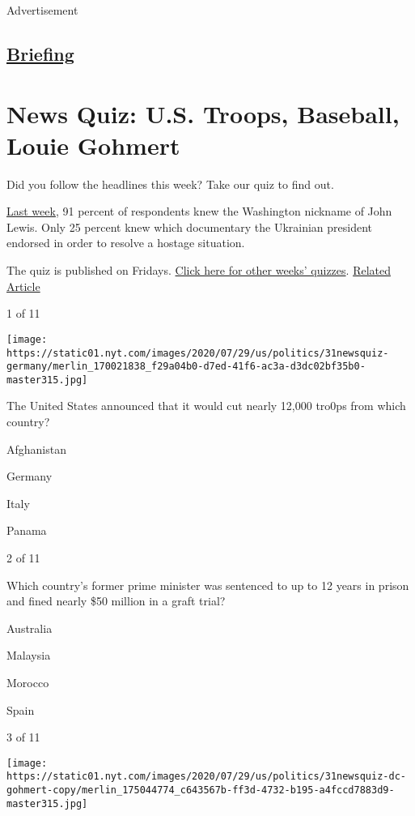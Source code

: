 Advertisement

\hypertarget{-briefing-}{%
\subsection{\texorpdfstring{
\href{/interactive/2018/briefing/global-morning-briefing-newsletter-signup.html}{Briefing}
}{ Briefing }}\label{-briefing-}}

\hypertarget{news-quiz-us-troops-baseball-louie-gohmert}{%
\section{News Quiz: U.S. Troops, Baseball, Louie
Gohmert}\label{news-quiz-us-troops-baseball-louie-gohmert}}

Did you follow the headlines this week? Take our quiz to find out.

\href{https://www.nytimes.com/interactive/2020/07/24/briefing/federal-agents-john-lewis-mars-news-quiz.html}{Last
week}, 91 percent of respondents knew the Washington nickname of John
Lewis. Only 25 percent knew which documentary the Ukrainian president
endorsed in order to resolve a hostage situation.

The quiz is published on Fridays.
\href{https://www.nytimes.com/spotlight/news-quiz}{Click here for other
weeks' quizzes}.
\href{https://www.nytimes.com/interactive/2020/07/24/briefing/federal-agents-john-lewis-mars-news-quiz.html}{Related
Article}

1 of 11

\texttt{[image: https://static01.nyt.com/images/2020/07/29/us/politics/31newsquiz-germany/merlin\_170021838\_f29a04b0-d7ed-41f6-ac3a-d3dc02bf35b0-master315.jpg]}

The United States announced that it would cut nearly 12,000 tro0ps from
which country?

Afghanistan

Germany

Italy

Panama

2 of 11

Which country's former prime minister was sentenced to up to 12 years in
prison and fined nearly \$50 million in a graft trial?

Australia

Malaysia

Morocco

Spain

3 of 11

\texttt{[image: https://static01.nyt.com/images/2020/07/29/us/politics/31newsquiz-dc-gohmert-copy/merlin\_175044774\_c643567b-ff3d-4732-b195-a4fccd7883d9-master315.jpg]}

